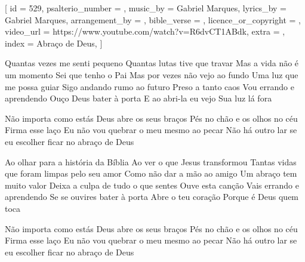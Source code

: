 % 

[
    id                     = {529},
    psalterio_number       = {},
    music_by               = {Gabriel Marques},
    lyrics_by              = {Gabriel Marques},
    arrangement_by         = {},
    bible_verse            = {},
    licence_or_copyright   = {},
    video_url              = {https://www.youtube.com/watch?v=R6dvCT1ABdk},
    extra                  = {},
    index                  = {Abraço de Deus},
]


\beginverse
Quantas vezes me senti pequeno
Quantas lutas tive que travar
Mas a vida não é um momento
Sei que tenho o Pai
Mas por vezes não vejo ao fundo
Uma luz que me possa guiar
Sigo andando rumo ao futuro
Preso a tanto caos
Vou errando e aprendendo
Ouço Deus bater à porta
E ao abri-la eu vejo
Sua luz lá fora
\endverse




\beginchorus
Não importa como estás
Deus abre os seus braços
Pés no chão e os olhos no céu
Firma esse laço
Eu não vou quebrar o meu
mesmo ao pecar
Não há outro lar se eu
escolher ficar no abraço de Deus
\endchorus


\beginverse
Ao olhar para a história da Bíblia
Ao ver o que Jesus transformou
Tantas vidas que foram limpas
pelo seu amor
Como não dar a mão ao amigo
Um abraço tem muito valor
Deixa a culpa de tudo o que sentes
Ouve esta canção
Vais errando e aprendendo
Se se ouvires bater à porta
Abre o teu coração
Porque é Deus quem toca
\endverse




\beginchorus
Não importa como estás
Deus abre os seus braços
Pés no chão e os olhos no céu
Firma esse laço
Eu não vou quebrar o meu
mesmo ao pecar
Não há outro lar se eu
escolher ficar no abraço de Deus
\endchorus

\endsong
